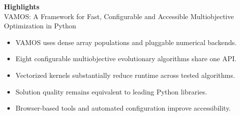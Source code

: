 \documentclass[10pt,a4paper]{article}
\begin{document}
\pagestyle{empty}

{\large\bfseries Highlights}\\[6pt]
{\small VAMOS: A Framework for Fast, Configurable and Accessible Multiobjective Optimization in Python}

\vspace{10pt}

\begin{itemize}[leftmargin=1.5em, itemsep=4pt]
  \item VAMOS uses dense array populations and pluggable numerical backends.
  \item Eight configurable multiobjective evolutionary algorithms share one API.
  \item Vectorized kernels substantially reduce runtime across tested algorithms.
  \item Solution quality remains equivalent to leading Python libraries.
  \item Browser-based tools and automated configuration improve accessibility.
\end{itemize}
\end{document}
